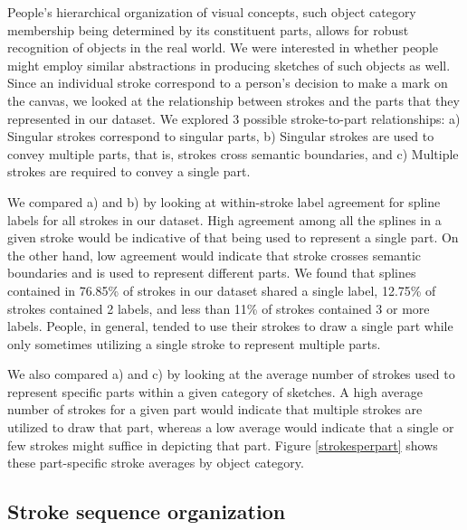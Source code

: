 \documentclass[10pt,letterpaper]{article}
\newcommand{\kushin}[1]{{\color{orange}{[kushin: #1]}}}
\begin{document}
People's hierarchical organization of visual concepts, such object category membership being determined by its constituent parts, allows for robust recognition of objects in the real world. 
We were interested in whether people might employ similar abstractions in producing sketches of such objects as well. 
Since an individual stroke correspond to a person's decision to make a mark on the canvas, we looked at the relationship between strokes and the parts that they represented in our dataset. 
We explored 3 possible stroke-to-part relationships:
a) Singular strokes correspond to singular parts, b) Singular strokes are used to convey multiple parts, that is, strokes cross semantic boundaries, and c) Multiple strokes are required to convey a single part. 

We compared a) and b) by looking at within-stroke label agreement for spline labels for all strokes in our dataset. High agreement among all the splines in a given stroke would be indicative of that being used to represent a single part. 
On the other hand, low agreement would indicate that stroke crosses semantic boundaries and is used to represent different parts. 
We found that splines contained in 76.85\% of strokes in our dataset shared a single label, 12.75\% of strokes contained 2 labels, and less than 11\% of strokes contained 3 or more labels. 
People, in general, tended to use their strokes to draw a single part while only sometimes utilizing a single stroke to represent multiple parts.

We also compared a) and c) by looking at the average number of strokes used to represent specific parts within a given category of sketches. 
A high average number of strokes for a given part would indicate that multiple strokes are utilized to draw that part, whereas a low average would indicate that a single or few strokes might suffice in depicting that part. 
Figure \ref{strokesperpart} shows these part-specific stroke averages by object category.
\kushin{I feel the above summary, including the figure caption for figure 2 is a little inconclusive. Thoughts on how to remedy this?}

\subsection{Stroke sequence organization}
\end{document}
